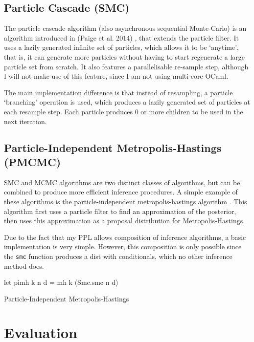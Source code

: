 \documentclass[sigconf]{acmart}
\begin{document}
\subsection{Particle Cascade (SMC)} \label{sec:pc}
The particle cascade algorithm (also asynchronous sequential Monte-Carlo) is an algorithm introduced in (Paige et al. 2014) \cite{paige2014asynchronous}, that extends the particle filter. It uses a lazily generated infinite set of particles, which allows it to be `anytime', that is, it can generate more particles without having to start regenerate a large particle set from scratch. It also features a parallelisable re-sample step, although I will not make use of this feature, since I am not using multi-core OCaml.

The main implementation difference is that instead of resampling, a particle `branching' operation is used, which produces a lazily generated set of particles at each resample step. Each particle produces 0 or more children to be used in the next iteration.

\subsection{Particle-Independent Metropolis-Hastings (PMCMC)} \label{sec:pimh}

SMC and MCMC algorithms are two distinct classes of algorithms, but can be combined to produce more efficient inference procedures. A simple example of these algorithms is the particle-independent metropolis-hastings algorithm \cite{pmcmc}. This algorithm first uses a particle filter to find an approximation of the posterior, then uses this approximation as a proposal distribution for Metropolis-Hastings.

Due to the fact that my PPL allows composition of inference algorithms, a basic implementation is very simple. However, this composition is only possible since the \texttt{smc} function produces a dist with conditionals, which no other inference method does.

\begin{listing}
\begin{ocamlcode-in}
    let pimh k n d = mh k (Smc.smc n d)
\end{ocamlcode-in}
  \caption{Particle-Independent Metropolis-Hastings}
\end{listing}

\section{Evaluation}
\label{s:evaluation}
\end{document}
